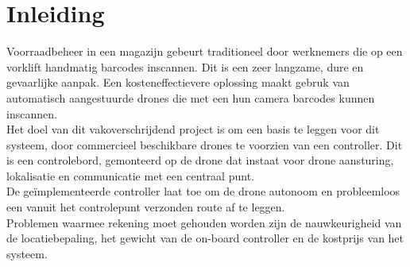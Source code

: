 \chapter*{Inleiding}
Voorraadbeheer in een magazijn gebeurt traditioneel door werknemers die op een vorklift handmatig barcodes inscannen.
Dit is een zeer langzame, dure en gevaarlijke aanpak.
Een kosteneffectievere oplossing maakt gebruk van automatisch aangestuurde drones die met een hun camera barcodes kunnen inscannen.\\

Het doel van dit vakoverschrijdend project is om een basis te leggen voor dit systeem, door commercieel beschikbare drones te voorzien van een controller.
Dit is een controlebord, gemonteerd op de drone dat instaat voor drone aansturing, lokalisatie en communicatie met een centraal punt.\\
De ge\"implementeerde controller laat toe om de drone autonoom en probleemloos een vanuit het controlepunt verzonden route af te leggen.\\

Problemen waarmee rekening moet gehouden worden zijn de nauwkeurigheid van de locatiebepaling, het gewicht van de on-board controller en de kostprijs van het systeem.